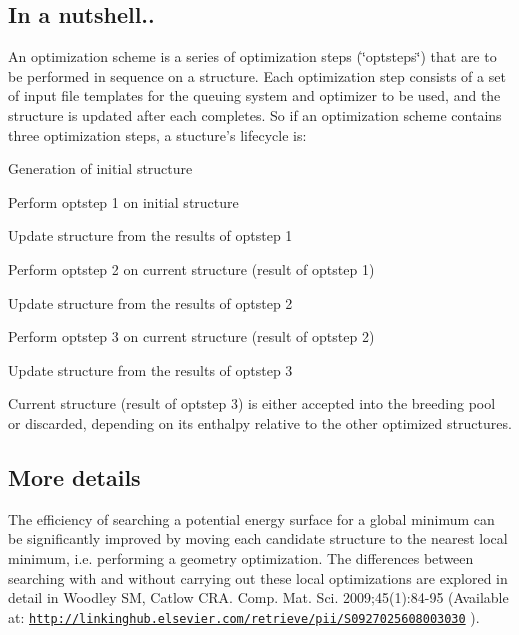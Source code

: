 \hypertarget{optschemes_quick-over}{}\subsection{In a nutshell..}\label{optschemes_quick-over}
An optimization scheme is a series of optimization steps (\char`\"{}optsteps\char`\"{}) that are to be performed in sequence on a structure. Each optimization step consists of a set of input file templates for the queuing system and optimizer to be used, and the structure is updated after each completes. So if an optimization scheme contains three optimization steps, a stucture's lifecycle is\-:


\begin{DoxyEnumerate}
\item Generation of initial structure
\item Perform optstep 1 on initial structure
\item Update structure from the results of optstep 1
\item Perform optstep 2 on current structure (result of optstep 1)
\item Update structure from the results of optstep 2
\item Perform optstep 3 on current structure (result of optstep 2)
\item Update structure from the results of optstep 3
\item Current structure (result of optstep 3) is either accepted into the breeding pool or discarded, depending on its enthalpy relative to the other optimized structures.
\end{DoxyEnumerate}\hypertarget{optschemes_detailed-over}{}\subsection{More details}\label{optschemes_detailed-over}
The efficiency of searching a potential energy surface for a global minimum can be significantly improved by moving each candidate structure to the nearest local minimum, i.\-e. performing a geometry optimization. The differences between searching with and without carrying out these local optimizations are explored in detail in Woodley S\-M, Catlow C\-R\-A. Comp. Mat. Sci. 2009;45(1)\-:84-\/95 (Available at\-: \href{http://linkinghub.elsevier.com/retrieve/pii/S0927025608003030}{\tt http\-://linkinghub.\-elsevier.\-com/retrieve/pii/\-S0927025608003030} ).

